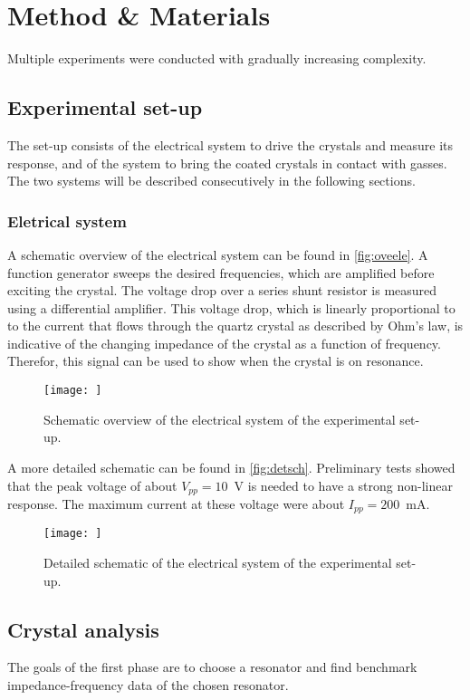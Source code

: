 \section{Method \& Materials}
Multiple experiments were conducted with gradually increasing complexity. 

\subsection{Experimental set-up}
The set-up consists of the electrical system to drive the crystals and measure its response, and of the system to bring the coated crystals in contact with gasses. The two systems will be described consecutively in the following sections.

\subsubsection{Eletrical system}
A schematic overview of the electrical system can be found in \autoref{fig:oveele}. A function generator sweeps the desired frequencies, which are amplified before exciting the crystal. The voltage drop over a series shunt resistor is measured using a differential amplifier. This voltage drop, which is linearly proportional to to the current that flows through the quartz crystal as described by Ohm's law, is indicative of the changing impedance of the crystal as a function of frequency. Therefor, this signal can be used to show when the crystal is on resonance. 
\begin{figure}
	\centering
		\texttt{[image: ]}
	\caption{Schematic overview of the electrical system of the experimental set-up. }
	\label{fig:oveele}
\end{figure}

A more detailed schematic can be found in \autoref{fig:detsch}. Preliminary tests showed that the peak voltage of about $V_{pp}=10$~V is needed to have a strong non-linear response. The maximum current at these voltage were about $I_{pp}=200$~mA. 
\begin{figure}
	\centering
		\texttt{[image: ]}
	\caption{Detailed schematic of the electrical system of the experimental set-up. }
	\label{fig:detsch}
\end{figure}

\subsection{Crystal analysis}
The goals of the first phase are to choose a resonator and find benchmark impedance-frequency data of the chosen resonator. 

